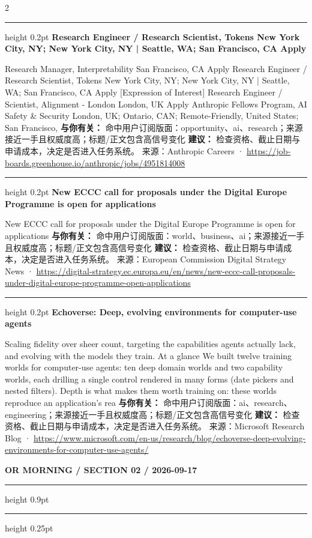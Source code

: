 \documentclass[10.5pt]{ctexart}
\begin{document}
\begin{multicols}{2}
\vspace{2mm}
\hrule height 0.2pt
\vspace{2mm}
{\large\bfseries Research Engineer / Research Scientist, Tokens New York City, NY; New York City, NY | Seattle, WA; San Francisco, CA Apply}\par
[Expression of Interest] Research Manager, Interpretability San Francisco, CA Apply Research Engineer / Research Scientist, Tokens New York City, NY; New York City, NY | Seattle, WA; San Francisco, CA Apply [Expression of Interest] Research Engineer / Scientist, Alignment - London London, UK Apply Anthropic Fellows Program, AI Safety \& Security London, UK; Ontario, CAN; Remote-Friendly, United States; San Francisco, 
\textbf{与你有关：} 命中用户订阅版面：opportunity、ai、research；来源接近一手且权威度高；标题/正文包含高信号变化
\textbf{建议：} 检查资格、截止日期与申请成本，决定是否进入任务系统。
{\footnotesize\color{ormuted} 来源：Anthropic Careers · \url{https://job-boards.greenhouse.io/anthropic/jobs/4951814008}}
\vspace{2mm}
\hrule height 0.2pt
\vspace{2mm}
{\large\bfseries New ECCC call for proposals under the Digital Europe Programme is open for applications}\par
New ECCC call for proposals under the Digital Europe Programme is open for applications
\textbf{与你有关：} 命中用户订阅版面：world、business、ai；来源接近一手且权威度高；标题/正文包含高信号变化
\textbf{建议：} 检查资格、截止日期与申请成本，决定是否进入任务系统。
{\footnotesize\color{ormuted} 来源：European Commission Digital Strategy News · \url{https://digital-strategy.ec.europa.eu/en/news/new-eccc-call-proposals-under-digital-europe-programme-open-applications}}
\vspace{2mm}
\hrule height 0.2pt
\vspace{2mm}
{\large\bfseries Echoverse: Deep, evolving environments for computer-use agents}\par
Scaling fidelity over sheer count, targeting the capabilities agents actually lack, and evolving with the models they train. At a glance We built twelve training worlds for computer-use agents: ten deep domain worlds and two capability worlds, each drilling a single control rendered in many forms (date pickers and nested filters). Depth is what makes them worth training on: these worlds reproduce an application’s rea
\textbf{与你有关：} 命中用户订阅版面：ai、research、engineering；来源接近一手且权威度高；标题/正文包含高信号变化
\textbf{建议：} 检查资格、截止日期与申请成本，决定是否进入任务系统。
{\footnotesize\color{ormuted} 来源：Microsoft Research Blog · \url{https://www.microsoft.com/en-us/research/blog/echoverse-deep-evolving-environments-for-computer-use-agents/}}
\end{multicols}
\newpage
{\small\bfseries OR MORNING / SECTION 02 / 2026-09-17}
\vspace{2mm}
\hrule height 0.9pt
\vspace{1.5mm}
\hrule height 0.25pt
\vspace{4mm}
\end{document}
